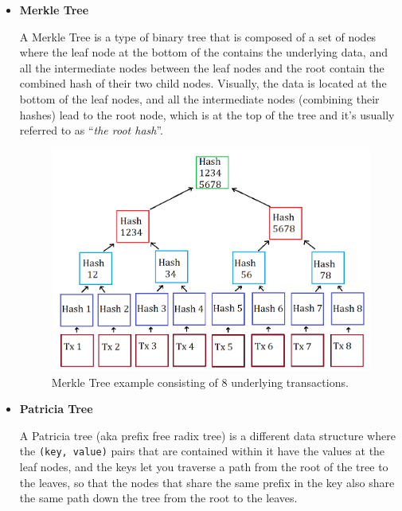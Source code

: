 \begin{itemize}
\item
  \textbf{Merkle Tree}

  A Merkle Tree is a type of binary tree that is composed of a set of
  nodes where the leaf node at the bottom of the contains the underlying
  data, and all the intermediate nodes between the leaf nodes and the
  root contain the combined hash of their two child nodes. Visually, the
  data is located at the bottom of the leaf nodes, and all the
  intermediate nodes (combining their hashes) lead to the root node,
  which is at the top of the tree and it's usually referred to as
  ``\emph{the root hash}''.

  \begin{figure}
  \centering
  \includegraphics[width=\linewidth]{../src/img/Merkle_Tree.png}
  \caption{Merkle Tree example consisting of 8 underlying transactions.}
  \end{figure}
\item
  \textbf{Patricia Tree}

  A Patricia tree (aka prefix free radix tree) is a different data
  structure where the \texttt{(key,\ value)} pairs that are contained
  within it have the values at the leaf nodes, and the keys let you
  traverse a path from the root of the tree to the leaves, so that the
  nodes that share the same prefix in the key also share the same path
  down the tree from the root to the leaves.


\end{itemize}
